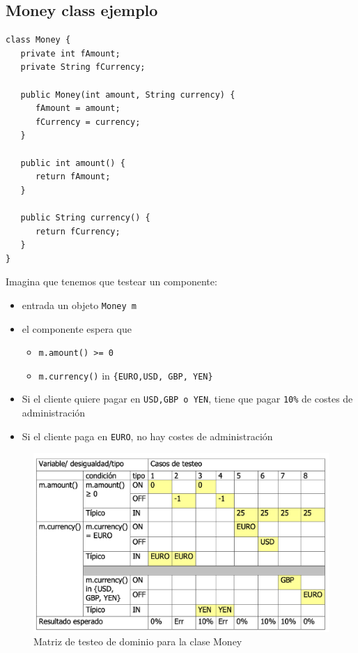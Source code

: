 \newpage
\subsection{Money class ejemplo}

\begin{paracol}{2}
   \begin{lstlisting}
class Money {
   private int fAmount;
   private String fCurrency;

   public Money(int amount, String currency) {
      fAmount = amount;
      fCurrency = currency;
   }

   public int amount() {
      return fAmount;
   }

   public String currency() {
      return fCurrency;
   }
}
   \end{lstlisting}

   \switchcolumn

   \colfill
   Imagina que tenemos que testear un componente:
\begin{itemize}
	\item entrada un objeto \lstinline|Money m|
	\item el componente espera que
	\begin{itemize}
      \item \lstinline|m.amount() >= 0|
      \item \lstinline|m.currency()| in \lstinline|{EURO,USD, GBP, YEN}|
   \end{itemize}
	\item Si el cliente quiere pagar en \lstinline|USD,GBP o YEN|, tiene que pagar \lstinline|10%| de costes de administración
	\item Si el cliente paga en \lstinline|EURO|, no hay costes de administración
\end{itemize}
   \colfill
\end{paracol}

\begin{figure}[htbp]
   \centering
   \includegraphics{images/05/matrizMoney.png}
   \caption{Matriz de testeo de dominio para la clase Money}
   \label{fig:05/matrizMoney}
\end{figure}

